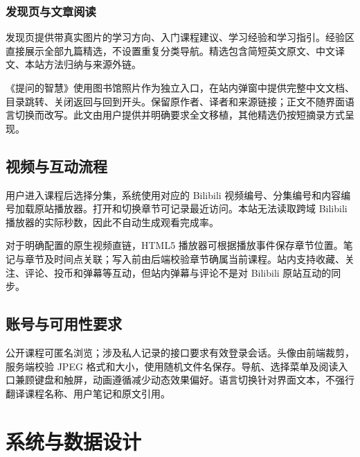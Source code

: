 \documentclass[UTF8,12pt,a4paper,openany,oneside]{ctexbook}
\begin{document}
\subsection{发现页与文章阅读}
发现页提供带真实图片的学习方向、入门课程建议、学习经验和学习指引。经验区直接展示全部九篇精选，不设置重复分类导航。精选包含简短英文原文、中文译文、本站方法归纳与来源外链。

《提问的智慧》使用图书馆照片作为独立入口，在站内弹窗中提供完整中文文档、目录跳转、关闭返回与回到开头。保留原作者、译者和来源链接；正文不随界面语言切换而改写。此文由用户提供并明确要求全文移植，其他精选仍按短摘录方式呈现。

\section{视频与互动流程}
用户进入课程后选择分集，系统使用对应的 Bilibili 视频编号、分集编号和内容编号加载原站播放器。打开和切换章节可记录最近访问。本站无法读取跨域 Bilibili 播放器的实际秒数，因此不自动生成观看完成率。

对于明确配置的原生视频直链，HTML5 播放器可根据播放事件保存章节位置。笔记与章节及时间点关联；写入前由后端校验章节确属当前课程。站内支持收藏、关注、评论、投币和弹幕等互动，但站内弹幕与评论不是对 Bilibili 原站互动的同步。

\section{账号与可用性要求}
公开课程可匿名浏览；涉及私人记录的接口要求有效登录会话。头像由前端裁剪，服务端校验 JPEG 格式和大小，使用随机文件名保存。导航、选择菜单及阅读入口兼顾键盘和触屏，动画遵循减少动态效果偏好。语言切换针对界面文本，不强行翻译课程名称、用户笔记和原文引用。

\chapter{系统与数据设计}
\end{document}
